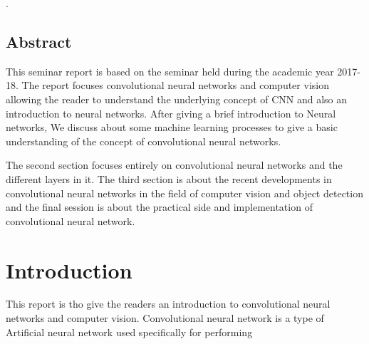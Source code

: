 \documentclass[12pt]{article}
\begin{document}
\newpage
.
\vspace{50mm}
\begin{center}
\section*{\fontsize{16}{18}\selectfont Abstract}
\end{center}
\par This seminar report is based on the seminar held during the academic year 2017-18. The report focuses convolutional neural networks and computer vision allowing the reader to understand the underlying concept of CNN and also an introduction to neural networks. After giving a brief introduction to Neural networks, We discuss about some machine learning processes to give a basic understanding of the concept of convolutional neural networks. 
\vspace{5mm}
\par The second section focuses entirely on convolutional neural networks and the different layers in it. The third section is about the recent developments in convolutional neural networks in the field of computer vision and object detection and the final session is about the practical side and implementation of convolutional neural network.

\newpage
{}
\tableofcontents
\newpage
{}

\listoffigures
\newpage


\vspace{25mm}
\section{\fontsize{14}{14}\selectfont Introduction}
 \par This report is tho give the readers an introduction to convolutional neural networks and computer vision.  Convolutional neural network is a type of Artificial neural network used specifically for performing 
\end{document}
